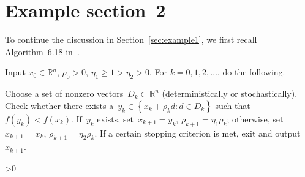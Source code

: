 \documentclass[12pt,a4paper,draft]{article}  %
\newcommand{\bibfile}{\jobname.bib}  %
\newcounter{cite}
\theoremstyle{definition}
\numberwithin{equation}{section}
\newcommand{\RR}{\mathbb{R}}
\begin{document}
\section{Example section~2}
\label{sec:example2}

To continue the discussion in Section~\ref{sec:example1}, we first recall Algorithm~6.18 in~\cite{Trefethen_Bau_1997}.

\begin{algorithm}[htbp!]
  \caption{\label{alg:example}An example algorithm}
Input $x_0\in \RR^n$, $\rho_0>0$, $\eta_1 \ge 1> \eta_2>0$. For $k = 0, 1, 2, \dots$, do the following.
\begin{algorithmic}[1]
  \State Choose a set of nonzero vectors~$D_k\subset \RR^{n}$ (deterministically or stochastically).
  \State Check whether there exists a~$y_k \in\left\{ x_k +\rho_k d\mathrel{:} d\in D_k \right\}$ such
  that~$f(y_k) < f(x_k)$.
  \State If~$y_k$ exists, set~$x_{k+1} = y_k$, $\rho_{k+1} = \eta_1 \rho_k$;
  otherwise, set~$x_{k+1} = x_k$, $\rho_{k+1} = \eta_2 \rho_k$.
  \State If a certain stopping criterion is met, exit and output~$x_{k+1}$.
\end{algorithmic}
\end{algorithm}


\ifnum\value{cite}>0
    \small
    
    
\fi

\end{document}
